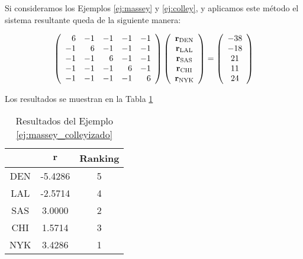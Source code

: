 \begin{ejemplo}\label{ej:massey_colleyizado}
Si consideramos los Ejemplos \ref{ej:massey} y \ref{ej:colley}, y aplicamos este método el sistema resultante queda de la siguiente manera:

\begin{equation*}
\left(\begin{array}{r r r r r}
 6 & -1 & -1 & -1 & -1\\
-1 &  6 & -1 & -1 & -1\\
-1 & -1 &  6 & -1 & -1\\
-1 & -1 & -1 &  6 & -1\\
-1 & -1 & -1 & -1 &  6
\end{array}\right)
\left(\begin{array}{c}
\mathbf{r}_{\text{DEN}}\\
\mathbf{r}_{\text{LAL}}\\
\mathbf{r}_{\text{SAS}}\\
\mathbf{r}_{\text{CHI}}\\
\mathbf{r}_{\text{NYK}}
\end{array}\right)
=
\left(\begin{array}{c}
-38\\
-18\\
21\\
11\\
24
\end{array}\right)
\end{equation*}

Los resultados se muestran en la Tabla \ref{tbl:massey_colleyizado}

\begin{table}[h]
\centering
\caption{Resultados del Ejemplo \ref{ej:massey_colleyizado}}
\label{tbl:massey_colleyizado}
\begin{tabular}{@{}ccc@{}}
\cmidrule(l){2-3}
    & $\mathbf{r}$ & Ranking \\ \midrule
DEN & -5.4286      & 5       \\
LAL & -2.5714      & 4       \\
SAS &  3.0000      & 2       \\
CHI &  1.5714      & 3       \\
NYK &  3.4286      & 1       \\ \bottomrule
\end{tabular}
\end{table}

\end{ejemplo}



